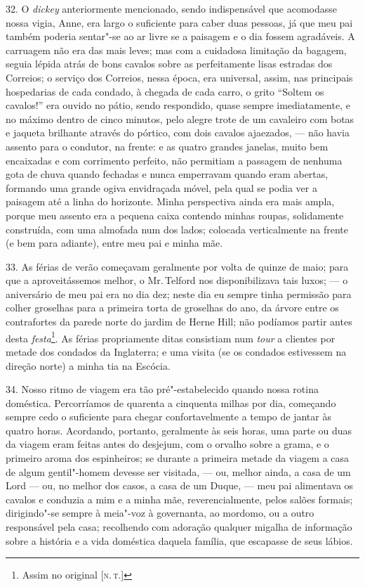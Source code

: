 32. O \emph{dickey} anteriormente mencionado, sendo indispensável que
acomodasse nossa vigia, Anne, era largo o suficiente para caber duas
pessoas, já que meu pai também poderia sentar"-se ao ar livre se a
paisagem e o dia fossem agradáveis. A carruagem não era das mais leves;
mas com a cuidadosa limitação da bagagem, seguia lépida atrás de bons
cavalos sobre as perfeitamente lisas estradas dos Correios; o serviço
dos Correios, nessa época, era universal, assim, nas principais
hospedarias de cada condado, à chegada de cada carro, o grito ``Soltem
os cavalos!'' era ouvido no pátio, sendo respondido, quase sempre
imediatamente, e no máximo dentro de cinco minutos, pelo alegre trote de
um cavaleiro com botas e jaqueta brilhante através do pórtico, com dois
cavalos ajaezados, --- não havia assento para o condutor, na frente: e as
quatro grandes janelas, muito bem encaixadas e com corrimento perfeito,
não permitiam a passagem de nenhuma gota de chuva quando fechadas e
nunca emperravam quando eram abertas, formando uma grande ogiva
envidraçada móvel, pela qual se podia ver a paisagem até a linha do
horizonte. Minha perspectiva ainda era mais ampla, porque meu assento
era a pequena caixa contendo minhas roupas, solidamente construída, com
uma almofada num dos lados; colocada verticalmente na frente (e bem para
adiante), entre meu pai e minha mãe.

33. As férias de verão começavam geralmente por volta de quinze de maio;
para que a aproveitássemos melhor, o Mr.\,Telford nos disponibilizava tais
luxos; --- o aniversário de meu pai era no dia dez; neste dia eu sempre
tinha permissão para colher groselhas para a primeira torta de groselhas
do ano, da árvore entre os contrafortes da parede norte do jardim de
Herne Hill; não podíamos partir antes desta \emph{festa}\footnote{Assim
  no original {[}\textsc{n.\,t.}{]}}. As férias propriamente ditas
consistiam num \emph{tour} a clientes por metade dos condados da
Inglaterra; e uma visita (se os condados estivessem na direção norte) a
minha tia na Escócia.

34. Nosso ritmo de viagem era tão pré"-estabelecido quando nossa rotina
doméstica. Percorríamos de quarenta a cinquenta milhas por dia,
começando sempre cedo o suficiente para chegar confortavelmente a tempo
de jantar às quatro horas. Acordando, portanto, geralmente às seis
horas, uma parte ou duas da viagem eram feitas antes do desjejum, com o
orvalho sobre a grama, e o primeiro aroma dos espinheiros; se durante a
primeira metade da viagem a casa de algum gentil"-homem devesse ser
visitada, --- ou, melhor ainda, a casa de um Lord --- ou, no melhor dos
casos, a casa de um Duque, --- meu pai alimentava os cavalos e conduzia a
mim e a minha mãe, reverencialmente, pelos salões formais; dirigindo"-se
sempre à meia"-voz à governanta, ao mordomo, ou a outro responsável pela
casa; recolhendo com adoração qualquer migalha de informação sobre a
história e a vida doméstica daquela família, que escapasse de seus
lábios.

